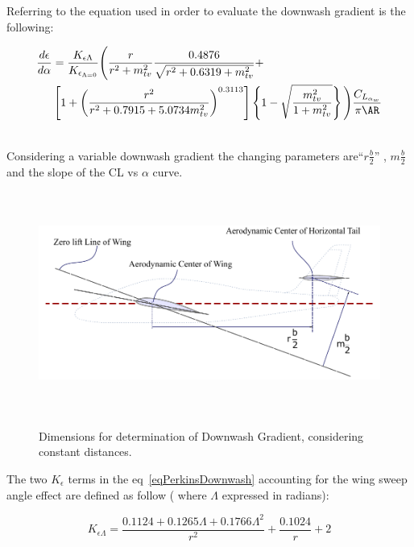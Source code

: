 Referring to \cite{Slinger} the equation used in order to evaluate the downwash gradient is the following: 

\begin{equation}
\begin{split}
 \frac{d\epsilon}{d\alpha} &= \frac{K_{\epsilon \Lambda}}{K_{\epsilon _{\Lambda=0}}}  \Biggr ( \frac{r}{r^2+m_{tv}^2} 
 \frac{0.4876}{\sqrt{r^2 + 0.6319 + m_{tv}^2}}  +\\
& \left [1+{ \left( \frac{r^2}{r^2 + 0.7915 + 5.0734 m_{tv}^2} \right) }^{0.3113}  \right ]    \left \{ 1- \sqrt{\frac{m_{tv}^2}{1+m_{tv}^2}} \right \}      \Biggl )    \frac{C_{L_{{\alpha}_w}}}{\pi \AR}
\end{split}
\label{eqPerkinsDownwash}
\end{equation}

\noindent \\
Considering a variable downwash gradient the changing parameters are``$r \frac{b}{2}$'' , $m \frac{b}{2}$ and the slope of the CL vs $\alpha$ curve.

\begin{figure}[H]
\centering
{\includegraphics[height=7.3cm]{Immagini/wing_htail_Roskam_eng.pdf}} 
\caption{Dimensions for determination of Downwash Gradient, considering constant distances.}
\label{PerkinsDownwash}
\end{figure} 

The two $K_{\epsilon}$ terms in the eq~\ref{eqPerkinsDownwash} accounting for the wing sweep angle effect are defined as follow ( where $\Lambda $ expressed in radians):

\begin{equation}
K_{\epsilon \Lambda} = \frac{ 0.1124 + 0.1265 \Lambda + 0.1766 \Lambda^2}{r^2} + \frac{0.1024}{r} +2
\end{equation}


